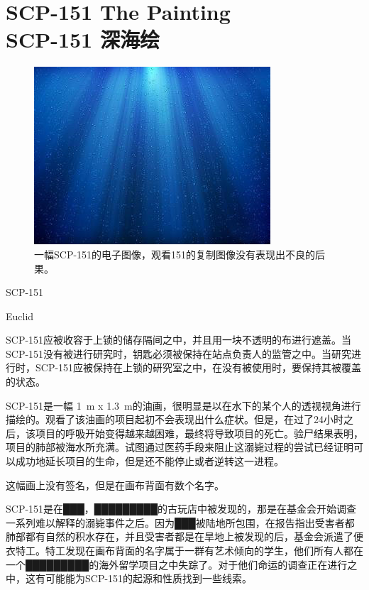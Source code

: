 \chapter[SCP-151 深海绘]{
    SCP-151 The Painting\\
    SCP-151 深海绘
}

\label{chap:SCP-151}

\begin{figure}[H]
    \centering
    \includegraphics[width=0.5\linewidth]{images/SCP-151.jpg}
    \caption*{一幅SCP-151的电子图像，观看151的复制图像没有表现出不良的后果。}
\end{figure}

SCP-151

Euclid

SCP-151应被收容于上锁的储存隔间之中，并且用一块不透明的布进行遮盖。当SCP-151没有被进行研究时，钥匙必须被保持在站点负责人的监管之中。当研究进行时，SCP-151应被保持在上锁的研究室之中，在没有被使用时，要保持其被覆盖的状态。

SCP-151是一幅 1 m x 1.3 m的油画，很明显是以在水下的某个人的透视视角进行描绘的。观看了该油画的项目起初不会表现出什么症状。但是，在过了24小时之后，该项目的呼吸开始变得越来越困难，最终将导致项目的死亡。验尸结果表明，项目的肺部被海水所充满。试图通过医药手段来阻止这溺毙过程的尝试已经证明可以成功地延长项目的生命，但是还不能停止或者逆转这一进程。

这幅画上没有签名，但是在画布背面有数个名字。

SCP-151是在███，█████████的古玩店中被发现的，那是在基金会开始调查一系列难以解释的溺毙事件之后。因为███被陆地所包围，在报告指出受害者都肺部都有自然的积水存在，并且受害者都是在旱地上被发现的后，基金会派遣了便衣特工。特工发现在画布背面的名字属于一群有艺术倾向的学生，他们所有人都在一个█████████的海外留学项目之中失踪了。对于他们命运的调查正在进行之中，这有可能能为SCP-151的起源和性质找到一些线索。
